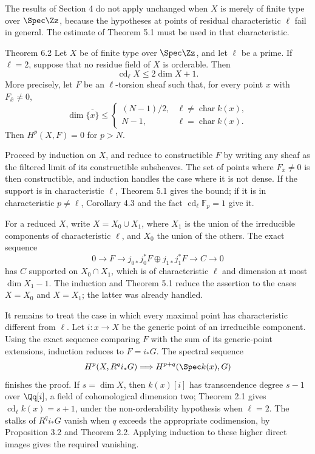 The results of Section 4 do not apply unchanged when \(X\) is merely of finite type over \(\Spec\Zz\), because the hypotheses at points of residual characteristic \(\ell\) fail in general. The estimate of Theorem 5.1 must be used in that characteristic.

\begin{statement}{Theorem 6.2}
Let \(X\) be of finite type over \(\Spec\Zz\), and let \(\ell\) be a prime. If \(\ell=2\), suppose that no residue field of \(X\) is orderable. Then
\[
\operatorname{cd}_\ell X\leq2\dim X+1.
\]
More precisely, let \(F\) be an \(\ell\)-torsion sheaf such that, for every point \(x\) with \(F_{\bar x}\ne0\),
\[
\dim\overline{\{x\}}\leq
\begin{cases}
(N-1)/2,&\ell\ne\operatorname{char}k(x),\\
N-1,&\ell=\operatorname{char}k(x).
\end{cases}
\]
Then \(H^p(X,F)=0\) for \(p>N\).
\end{statement}

\begin{prooftext}
Proceed by induction on \(X\), and reduce to constructible \(F\) by writing any sheaf as the filtered limit of its constructible subsheaves. The set of points where \(F_{\bar x}\ne0\) is then constructible, and induction handles the case where it is not dense. If the support is in characteristic \(\ell\), Theorem 5.1 gives the bound; if it is in characteristic \(p\ne\ell\), Corollary 4.3 and the fact \(\operatorname{cd}_\ell\mathbb{F}_p=1\) give it.

For a reduced \(X\), write \(X=X_0\cup X_1\), where \(X_1\) is the union of the irreducible components of characteristic \(\ell\), and \(X_0\) the union of the others. The exact sequence
\[
0\to F\to j_{0*}j_0^*F\oplus j_{1*}j_1^*F\to C\to0
\]
has \(C\) supported on \(X_0\cap X_1\), which is of characteristic \(\ell\) and dimension at most \(\dim X_1-1\). The induction and Theorem 5.1 reduce the assertion to the cases \(X=X_0\) and \(X=X_1\); the latter was already handled.

It remains to treat the case in which every maximal point has characteristic different from \(\ell\). Let \(i:x\to X\) be the generic point of an irreducible component. Using the exact sequence comparing \(F\) with the sum of its generic-point extensions, induction reduces to \(F=i_*G\). The spectral sequence
\[
H^p(X,R^qi_*G)\Longrightarrow H^{p+q}(\Spec k(x),G)
\]
finishes the proof. If \(s=\dim X\), then \(k(x)[i]\) has transcendence degree \(s-1\) over \(\Qq[i]\), a field of cohomological dimension two; Theorem 2.1 gives \(\operatorname{cd}_\ell k(x)=s+1\), under the non-orderability hypothesis when \(\ell=2\). The stalks of \(R^qi_*G\) vanish when \(q\) exceeds the appropriate codimension, by Proposition 3.2 and Theorem 2.2. Applying induction to these higher direct images gives the required vanishing.
\end{prooftext}

